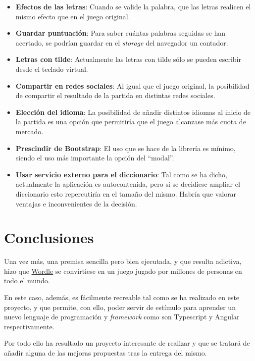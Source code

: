 \documentclass{\ClassPath/viu-tfm-template}
\begin{document}
\vspace{-1em}
\begin{itemize}
    \item \textbf{Efectos de las letras}: Cuando se valide la palabra, que las letras realicen el mismo efecto que en el juego original.

    \item \textbf{Guardar puntuación}: Para saber cuántas palabras seguidas se han acertado, se podrían guardar en el \textit{storage} del navegador un contador.

    \item \textbf{Letras con tilde}: Actualmente las letras con tilde sólo se pueden escribir desde el teclado virtual.

    \item \textbf{Compartir en redes sociales}: Al igual que el juego original, la posibilidad de compartir el resultado de la partida en distintas redes sociales.

    \item \textbf{Elección del idioma}: La posibilidad de añadir distintos idiomas al inicio de la partida es una opción que permitiría que el juego alcanzase más cuota de mercado.

    \item \textbf{Prescindir de Bootstrap}: El uso que se hace de la librería es mínimo, siendo el uso más importante la opción del “modal”.

    \item \textbf{Usar servicio externo para el diccionario}: Tal como se ha dicho, actualmente la aplicación es autocontenida, pero si se decidiese ampliar el diccionario esto repercutiría en el tamaño del mismo. Habría que valorar ventajas e inconvenientes de la decisión.
\end{itemize}
\vspace{-1em}


\chapter{Conclusiones}

Una vez más, una premisa sencilla pero bien ejecutada, y que resulta adictiva, hizo que \href{https://www.nytimes.com/games/wordle/index.html}{Wordle} se convirtiese en un juego jugado por millones de personas en todo el mundo.

En este caso, además, es fácilmente recreable tal como se ha realizado en este proyecto, y que permite, con ello, poder servir de estímulo para aprender un nuevo lenguaje de programación y \textit{framework} como son Typescript y Angular respectivamente.

Por todo ello ha resultado un proyecto interesante de realizar y que se tratará de añadir alguna de las mejoras propuestas tras la entrega del mismo.
\end{document}

